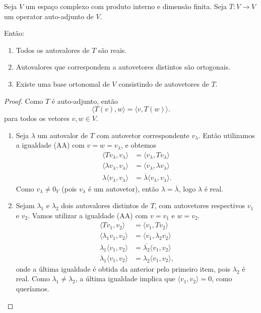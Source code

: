 \begin{theorem}
	Seja $V$ um espaço complexo com produto interno e dimensão finita. Seja $T\colon V\to V$ um operator auto-adjunto de $V$.
	
	Então:
	\begin{enumerate}
		\item Todos os autovalores de $T$ são reais.
		\item Autovalores que correspondem a autovetores distintos são ortogonais.
		\item Existe uma base ortonomal de $V$ consistindo de autovetores de $T$.
	\end{enumerate}
\end{theorem}

\begin{proof}
	Como $T$ é auto-adjunto, então
	\[\langle T(v),w\rangle=\langle v,T(w)\rangle.\tag{AA}\]
	para todos os vetores $v,w\in V$.
	\begin{enumerate}
		\item Seja $\lambda$ um autovalor de $T$ com autovetor correspondente $v_\lambda$. Então utilizamos a igualdade (AA) com $v=w=v_\lambda$, e obtemos
		\begin{align*}
			\langle Tv_\lambda,v_\lambda\rangle
				&=\langle v_\lambda,Tv_\lambda\rangle\\
			\langle \lambda v_\lambda,v_\lambda\rangle
				&=\langle v_\lambda,\lambda v_\lambda\rangle\\
			\lambda \langle v_\lambda,v_\lambda\rangle
				&=\overline{\lambda}\langle v_\lambda,v_\lambda\rangle.
		\end{align*}
		Como $v_\lambda\neq 0_V$ (pois $v_\lambda$ é um autovetor), então $\lambda=\overline{\lambda}$, logo $\lambda$ é real.
		
		\item Sejam $\lambda_1$ e $\lambda_2$ dois autovalores distintos de $T$, com autovetores respectivos $v_1$ e $v_2$. Vamos utilizar a igualdade (AA) com $v=v_1$ e $w=v_2$.
		\begin{align*}
			\langle Tv_1,v_2\rangle&=\langle v_1,Tv_2\rangle\\
			\langle \lambda_1 v_1,v_2\rangle&=\langle v_1,\lambda_2 v_2\rangle\\
			\lambda_1 \langle v_1,v_2\rangle&=\overline{\lambda_2}\langle v_1,v_2\rangle\\
			\lambda_1 \langle v_1,v_2\rangle&=\lambda_2\langle v_1,v_2\rangle,
		\end{align*}
		onde a última igualdade é obtida da anterior pelo primeiro item, pois $\lambda_2$ é real. Como $\lambda_1\neq\lambda_2$, a última igualdade implica que $\langle v_1,v_2\rangle=0$, como queríamos.
		

\end{enumerate}
\end{proof}
